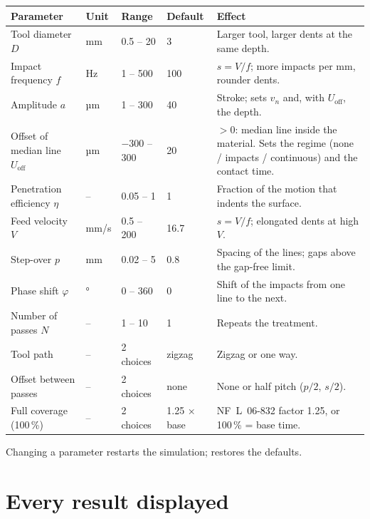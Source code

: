 \documentclass[11pt,a4paper]{article}
\begin{document}
\begin{longtable}{@{}p{3.9cm}p{1.1cm}p{2.0cm}p{1.9cm}p{5.2cm}@{}}
\toprule
\textbf{Parameter} & \textbf{Unit} & \textbf{Range} & \textbf{Default} & \textbf{Effect}\\ \midrule\endhead
Tool diameter $D$ & mm & 0.5 -- 20 & 3 & Larger tool, larger dents at the same depth.\\
Impact frequency $f$ & Hz & 1 -- 500 & 100 & $s=V/f$; more impacts per mm, rounder dents.\\
Amplitude $a$ & µm & 1 -- 300 & 40 & Stroke; sets $v_n$ and, with $U_\mathrm{off}$, the depth.\\
Offset of median line $U_\mathrm{off}$ & µm & $-300$ -- 300 & 20 & $>0$: median line inside the material. Sets the regime (none / impacts / continuous) and the contact time.\\
Penetration efficiency $\eta$ & -- & 0.05 -- 1 & 1 & Fraction of the motion that indents the surface.\\
Feed velocity $V$ & mm/s & 0.5 -- 200 & 16.7 & $s=V/f$; elongated dents at high $V$.\\
Step-over $p$ & mm & 0.02 -- 5 & 0.8 & Spacing of the lines; gaps above the gap-free limit.\\
Phase shift $\varphi$ & ° & 0 -- 360 & 0 & Shift of the impacts from one line to the next.\\
Number of passes $N$ & -- & 1 -- 10 & 1 & Repeats the treatment.\\
Tool path & -- & 2 choices & zigzag & Zigzag or one way.\\
Offset between passes & -- & 2 choices & none & None or half pitch ($p/2$, $s/2$).\\
Full coverage (100\,\%) & -- & 2 choices & 1.25 × base & NF~L~06-832 factor 1.25, or 100\,\% = base time.\\
\bottomrule
\end{longtable}
\noindent Changing a parameter restarts the simulation;  restores the defaults.

\section{Every result displayed}\label{sec:reads}
\end{document}
